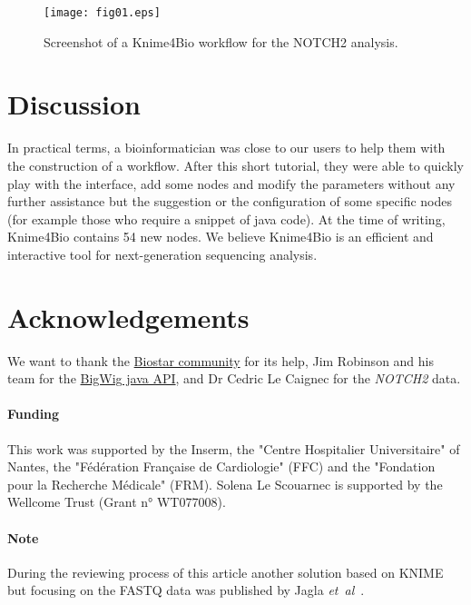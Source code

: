 \documentclass{bioinfo}
\begin{document}
\begin{figure}[!tpb]%
\centerline{\texttt{[image: fig01.eps]}}
\caption{Screenshot of a Knime4Bio workflow for the NOTCH2 analysis.}\label{fig:x1}
\end{figure}

\section{Discussion}
In practical terms, a bioinformatician was close to our users to help them with the construction of a workflow. After this short tutorial, they were able to quickly play with the interface, add some nodes and modify the parameters without any further assistance but the suggestion or the configuration of some specific nodes (for example those who require a snippet of java code).  At the time of writing, Knime4Bio contains 54 new nodes. We believe Knime4Bio is an efficient and interactive tool for next-generation sequencing analysis.

\section*{Acknowledgements}
We want to thank the  \href{http://biostar.stackexchange.com/}{Biostar community} for its help, Jim Robinson and his team for the \href{http://code.google.com/p/bigwig/}{BigWig java API}, and Dr Cedric Le Caignec for the \textit{NOTCH2} data.

\paragraph{Funding\textcolon} This work was supported by the Inserm, the "Centre Hospitalier Universitaire" of Nantes, the "F\'{e}d\'{e}ration Fran\c{c}aise de Cardiologie" (FFC) and the "Fondation pour la Recherche M\'{e}dicale" (FRM). Solena Le Scouarnec is supported by the Wellcome Trust (Grant n° WT077008).

\paragraph{Note\textcolon} During the reviewing process of this article another solution based on KNIME but focusing on the FASTQ data was published by Jagla \textit{et~al}~\citep{pmid21873641}.
\\


\end{document}
